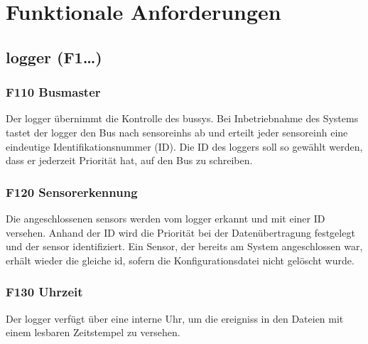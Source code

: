%
%

\thispagestyle{empty}
\chapter{Funktionale Anforderungen}\label{chap.funktionale}
\section{\gls{logger} (F1\ldots)}


\subsection{F110 Busmaster}
Der \gls{logger} übernimmt die Kontrolle des \gls{bussys}. Bei Inbetriebnahme des Systems tastet der \gls{logger} den Bus nach \glspl{sensoreinh} ab und erteilt jeder \gls{sensoreinh} eine eindeutige Identifikationsnummer (ID). Die ID des \gls{logger}s soll so gewählt werden, dass er jederzeit Priorität hat, auf den Bus zu schreiben.


\subsection{F120 Sensorerkennung}
Die angeschlossenen \glspl{sensor} werden vom \gls{logger} erkannt und mit einer ID versehen. Anhand der ID wird die Priorität bei der Datenübertragung festgelegt und der \gls{sensor} identifiziert. Ein Sensor, der bereits am System angeschlossen war, erhält wieder die gleiche \gls{id}, sofern die Konfigurationsdatei nicht gelöscht wurde.


\subsection{F130 Uhrzeit}
Der \gls{logger} verfügt über eine interne Uhr, um die \glspl{ereignis} in den Dateien mit einem lesbaren Zeitstempel zu versehen.


